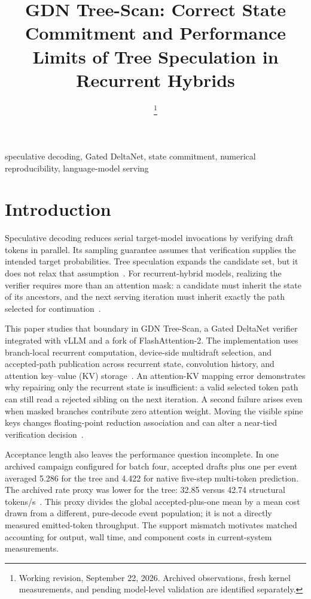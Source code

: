 \documentclass[conference]{IEEEtran}
\newcommand{\sys}{GDN Tree-Scan}
\begin{document}
\title{GDN Tree-Scan: Correct State Commitment and Performance Limits of Tree Speculation in Recurrent Hybrids}
\author{
\thanks{Working revision, September 22, 2026. Archived observations, fresh kernel measurements, and pending model-level validation are identified separately.}}
\maketitle

\begin{IEEEkeywords}
speculative decoding, Gated DeltaNet, state commitment, numerical reproducibility, language-model serving
\end{IEEEkeywords}

\section{Introduction}
Speculative decoding reduces serial target-model invocations by verifying draft tokens in parallel. Its sampling guarantee assumes that verification supplies the intended target probabilities. Tree speculation expands the candidate set, but it does not relax that assumption~\cite{leviathan2023fast,chen2023sampling,miao2023specinfer}. For recurrent-hybrid models, realizing the verifier requires more than an attention mask: a candidate must inherit the state of its ancestors, and the next serving iteration must inherit exactly the path selected for continuation~\cite{yang2024gated,wu2025stree}.

This paper studies that boundary in \sys{}, a Gated DeltaNet verifier integrated with vLLM and a fork of FlashAttention-2. The implementation uses branch-local recurrent computation, device-side multidraft selection, and accepted-path publication across recurrent state, convolution history, and attention key--value (KV) storage~\cite{lumo2026receipts,lumo2026stateless}. An attention-KV mapping error demonstrates why repairing only the recurrent state is insufficient: a valid selected token path can still read a rejected sibling on the next iteration. A second failure arises even when masked branches contribute zero attention weight. Moving the visible spine keys changes floating-point reduction association and can alter a near-tied verification decision~\cite{lumo2026spine}.

Acceptance length also leaves the performance question incomplete. In one archived campaign configured for batch four, accepted drafts plus one per event averaged 5.286 for the tree and 4.422 for native five-step multi-token prediction. The archived rate proxy was lower for the tree: 32.85 versus 42.74 structural tokens/s~\cite{lumo2026cost,lumo2026archive}. This proxy divides the global accepted-plus-one mean by a mean cost drawn from a different, pure-decode event population; it is not a directly measured emitted-token throughput. The support mismatch motivates matched accounting for output, wall time, and component costs in current-system measurements.
\end{document}
